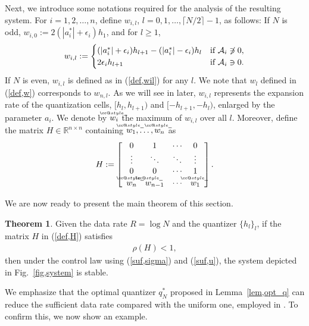 \documentclass[a4paper, 11pt]{article}
\makeatletter
\def\widebar{\accentset{{\cc@style\underline{\mskip10mu}}}}
\newcommand{\R}{\mathbb{R}}
\newcommand{\calA}{\mathcal{A}}
\theoremstyle{definition}
\newtheorem{thm}{Theorem}
\newcommand{\fref}[1]{Fig.~\ref{#1}}
\makeatother
\begin{document}
Next, we introduce some notations required for the analysis of the resulting system.
For $i=1,2,\dots,n$, define $w_{i,l}$, $l=0,1,\dots,\lceil N/2 \rceil-1$,
as follows:
If $N$ is odd, $w_{i,0}:=2(|a_i^*|+\epsilon_i)h_{1}$, and for $l\geq1$,
\begin{align}
 w_{i,l}:=
 \begin{cases}
  (|a_i^*|+\epsilon_i)h_{l+1}-(|a_i^*|-\epsilon_i)h_{l} & \textnormal{if } \calA_i\not\ni 0,\\
  2\epsilon_ih_{l+1} & \textnormal{if } \calA_i\ni 0.
 \end{cases}\label{def,wil}
\end{align}
If $N$ is even, $w_{i,l}$ is defined as in (\ref{def,wil}) for any $l$.
We note that $w_{l}$ defined in (\ref{def,w}) corresponds to $w_{n,l}$.
As we will see in later, $w_{i,l}$ represents the expansion rate of the
quantization cells, $[h_{l},h_{l+1})$ and $[-h_{l+1},-h_l)$, enlarged
by the parameter $a_i$.
We denote by $\widebar w_i$ the maximum of $w_{i,l}$ over all $l$.
Moreover, define the matrix $H\in\R^{n\times n}$ containing $\widebar w_1,\dots,\widebar w_n$ as
\begin{gather}
 H:=\left[\begin{array}{cccc}
   0& 1& \cdots& 0\\
   \vdots& \ddots& \ddots& \vdots\\
   0& 0& \cdots& 1\\
   \widebar w_n & \widebar w_{n-1} & \cdots& \widebar w_1
 \end{array}\right].\label{def,H}
\end{gather}

We are now ready to present the main theorem of this section.
\begin{thm}\label{th,suf}
 Given the data rate $R=\log N$ and the quantizer $\{h_l\}_l$,
if the matrix $H$ in (\ref{def,H}) satisfies
\begin{align}
 \rho(H)<1\label{suf_cond},
\end{align}
then under the control law using (\ref{suf,sigma}) and (\ref{suf,u}),
the system depicted in \fref{fig,system} is stable.
\end{thm}


We emphasize that the optimal quantizer $q_N^*$ proposed in Lemma~\ref{lem,opt_q}
can reduce the sufficient data rate compared with the uniform one,
employed in \cite{Martins2006, Phat2004, Okano2012}.
To confirm this, we now show an example.
\end{document}
